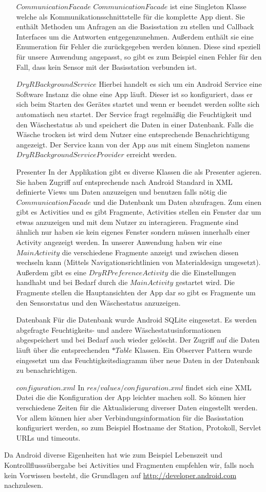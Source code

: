 \begin{enumerate}
	\item[$CommunicationFacade$] $CommunicationFacade$ ist eine Singleton Klasse welche als Kommunikationsschnittstelle für die komplette App dient. Sie enthält Methoden um Anfragen an die Basisstation zu stellen und Callback Interfaces um die Antworten entgegenzunehmen. Außerdem enthält sie eine Enumeration für Fehler die zurückgegeben werden können. Diese sind speziell für unsere Anwendung angepasst, so gibt es zum Beispiel einen Fehler für den Fall, dass kein Sensor mit der Basisstation verbunden ist.
	
	\item[$DryRBackgroundService$] Hierbei handelt es sich um ein Android Service eine Software Instanz die ohne eine App läuft. Dieser ist so konfiguriert, dass er sich beim Starten des Gerätes startet und wenn er beendet werden sollte sich automatisch neu startet. Der Service fragt regelmäßig die Feuchtigkeit und den Wäschestatus ab und speichert die Daten in einer Datenbank. Falls die Wäsche trocken ist wird dem Nutzer eine entsprechende Benachrichtigung angezeigt. Der Service kann von der App aus mit einem Singleton namens $DryRBackgroundServiceProvider$ erreicht werden.
	
	\item[Presenter] In der Applikation gibt es diverse Klassen die als Presenter agieren. Sie haben Zugriff auf entsprechende nach Android Standard in XML definierte Views um Daten anzuzeigen und benutzen falls nötig die $CommunicationFacade$ und die Datenbank um Daten abzufragen. Zum einen gibt es Activities und es gibt Fragmente, Activities stellen ein Fenster dar um etwas anzuzeigen und mit dem Nutzer zu interagieren. Fragmente sind ähnlich nur haben sie kein eigenes Fenster sondern müssen innerhalb einer Activity angezeigt werden. In unserer Anwendung haben wir eine $MainActivity$ die verschiedene Fragmente anzeigt und zwischen diesen wechseln kann (Mittels Navigationsrichtlinien von Materialdesign umgesetzt). Außerdem gibt es eine $DryRPreferenceActivity$ die die Einstellungen handhabt und bei Bedarf durch die $MainActivity$ gestartet wird. Die Fragmente stellen die Hauptansichten der App dar so gibt es Fragmente um den Sensorstatus und den Wäschestatus anzuzeigen.
	
	\item[Datenbank] Für die Datenbank wurde Android SQLite eingesetzt. Es werden abgefragte Feuchtigkeits- und andere Wäschestatusinformationen abgespeichert und bei Bedarf auch wieder gelöscht. Der Zugriff auf die Daten läuft über die entsprechenden $*Table$ Klassen. Ein Observer Pattern wurde eingesetzt um das Feuchtigkeitsdiagramm über neue Daten in der Datenbank zu benachrichtigen.
	
	\item[$configuration.xml$] In $res/values/configuration.xml$ findet sich eine XML Datei die die Konfiguration der App leichter machen soll. So können hier verschiedene Zeiten für die Aktualisierung diverser Daten eingestellt werden. Vor allem können hier aber Verbindungsinformation für die Basisstation konfiguriert werden, so zum Beispiel Hostname der Station, Protokoll, Servlet URLs und timeouts.
\end{enumerate}
Da Android diverse Eigenheiten hat wie zum Beispiel Lebenszeit und Kontrollflusssübergabe bei Activities und Fragmenten empfehlen wir, falls noch kein Vorwissen besteht, die Grundlagen auf \url{http://developer.android.com} nachzulesen.
